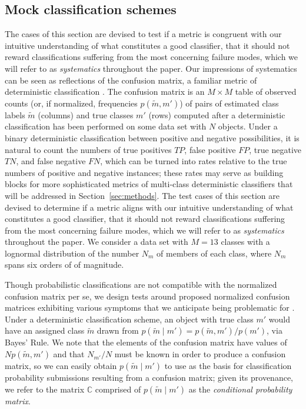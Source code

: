 \subsection{Mock classification schemes}
\label{sec:mockdata}

The cases of this section are devised to test if a metric is congruent with our intuitive understanding of what constitutes a good classifier, that it should not reward classifications suffering from the most concerning failure modes, which we will refer to as \textit{systematics} throughout the paper.
Our impressions of systematics can be seen as reflections of the confusion matrix, a familiar metric of deterministic classification \citep{2012PASP..124.1175B}.
The confusion matrix is an $M \times M$ table of observed counts (or, if normalized, frequencies $p(\tilde{m}, m')$) of pairs of estimated class labels $\tilde{m}$ (columns) and true classes $m'$ (rows) computed after a deterministic classification has been performed on some data set with $N$ objects.
Under a binary deterministic classification between positive and negative possibilities, it is natural to count the numbers of true positives $TP$, false positive $FP$, true negative $TN$, and false negative $FN$, which can be turned into rates relative to the true numbers of positive and negative instances; these rates may serve as building blocks for more sophisticated metrics of multi-class deterministic classifiers that will be addressed in Section~\ref{sec:methods}.
The test cases of this section are devised to determine if a metric aligns with our intuitive understanding of what constitutes a good classifier, that it should not reward classifications suffering from the most concerning failure modes, which we will refer to as \textit{systematics} throughout the paper.
We consider a data set with $M=13$ classes with a lognormal distribution of the number $N_{m}$ of members of each class, where $N_{m}$ spans six orders of of magnitude.

Though probabilistic classifications are not compatible with the normalized confusion matrix per se, we design tests around proposed normalized confusion matrices exhibiting various symptoms that we anticipate being problematic for \lsst.
Under a deterministic classification scheme, an object with true class $m'$ would have an assigned class $\tilde{m}$ drawn from $p(\tilde{m} \mid m') = p(\tilde{m}, m') / p(m')$, via Bayes' Rule.
We note that the elements of the confusion matrix have values of $N p(\tilde{m}, m')$ and that $N_{m'} / N$ must be known in order to produce a confusion matrix, so we can easily obtain $p(\tilde{m} \mid m')$ to use as the basis for classification probability submissions resulting from a confusion matrix; given its provenance, we refer to the matrix $\mathbb{C}$ comprised of $p(\tilde{m} \mid m')$ as the \textit{conditional probability matrix}.

